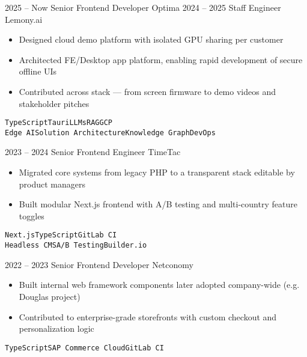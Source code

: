 \documentclass[2pt]{template}
\begin{document}
\begin{entrylist}
    \entry
    {2025 -- Now}
    {Senior Frontend Developer}
    {Optima}
    {}
    \entry
    {2024 -- 2025}
    {Staff Engineer}
    {Lemony.ai}
    {
        \begin{itemize}[noitemsep,topsep=5pt,leftmargin=8pt]
            \item Designed cloud demo platform with isolated GPU sharing per customer
            \item Architected FE/Desktop app platform, enabling rapid development of secure offline UIs
            \item Contributed across stack — from screen firmware to demo videos and stakeholder pitches
        \end{itemize}
        \texttt{TypeScript}\slashsep\texttt{Tauri}\slashsep\texttt{LLMs}\slashsep\texttt{RAG}\slashsep\texttt{GCP}\\
        {\color{gray}\texttt{Edge AI}\slashsep\texttt{Solution Architecture}\slashsep\texttt{Knowledge Graph}\slashsep\texttt{DevOps}}}

    \entry
    {2023 -- 2024}
    {Senior Frontend Engineer}
    {TimeTac}
    {
        \begin{itemize}[noitemsep,topsep=5pt,leftmargin=8pt]
            \item Migrated core systems from legacy PHP to a transparent stack editable by product managers
            \item Built modular Next.js frontend with A/B testing and multi-country feature toggles
        \end{itemize}
        \texttt{Next.js}\slashsep\texttt{TypeScript}\slashsep\texttt{GitLab CI}\\
        {\color{gray}\texttt{Headless CMS}\slashsep\texttt{A/B Testing}\slashsep\texttt{Builder.io}}}

    \entry
    {2022 -- 2023}
    {Senior Frontend Developer}
    {Netconomy}
    {
        \begin{itemize}[noitemsep,topsep=5pt,leftmargin=8pt]
            \item Built internal web framework components later adopted company-wide (e.g. Douglas project)
            \item Contributed to enterprise-grade storefronts with custom checkout and personalization logic
        \end{itemize}
        \texttt{TypeScript}\slashsep\texttt{SAP Commerce Cloud}\slashsep\texttt{GitLab CI}}


\end{entrylist}
\end{document}
